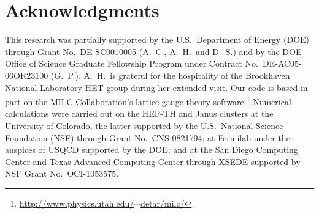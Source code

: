\documentclass{PoS}
\begin{document}
\section*{Acknowledgments} %
This research was partially supported by the U.S.~Department of Energy (DOE) through Grant No.~DE-SC0010005 (A.~C., A.~H.\ and D.~S.) and by the DOE Office of Science Graduate Fellowship Program under Contract No.~DE-AC05-06OR23100 (G.~P.).
A.~H.\ is grateful for the hospitality of the Brookhaven National Laboratory HET group during her extended visit.
Our code is based in part on the MILC Collaboration's lattice gauge theory software.\footnote{\href{http://www.physics.utah.edu/~detar/milc/}{http://www.physics.utah.edu/$\sim$detar/milc/}}
Numerical calculations were carried out on the HEP-TH and Janus clusters at the University of Colorado, the latter supported by the U.S.~National Science Foundation (NSF) through Grant No.~CNS-0821794; at Fermilab under the auspices of USQCD supported by the DOE; and at the San Diego Computing Center and Texas Advanced Computing Center through XSEDE supported by NSF Grant No.~OCI-1053575.





\end{document}
